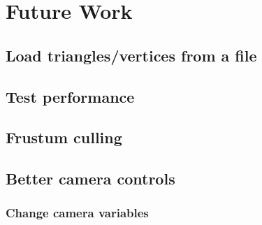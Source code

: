 \section{Future Work} 

\subsection{Load triangles/vertices from a file}

\subsection{Test performance}

\subsection{Frustum culling}

\subsection{Better camera controls}

\subsubsection{Change camera variables}